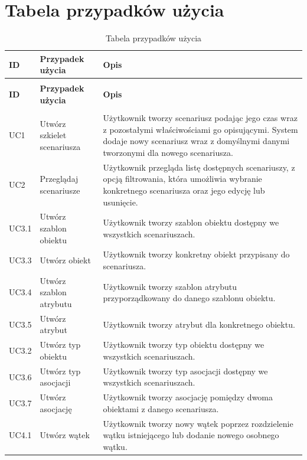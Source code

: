 \section{Tabela przypadków użycia}
\small{
\begin{longtable}{|p{1cm}|p{4.5cm}|p{8cm}|}
    \hline
    \textbf{ID} & \textbf{Przypadek użycia} & \textbf{Opis} \\
    \hline
    \endfirsthead
    \caption[]{Tabela przypadków użycia -- ciąg dalszy} \\
    \hline
    \textbf{ID} & \textbf{Przypadek użycia} & \textbf{Opis} \\
    \hline
    \endhead
    \hline
    \endfoot
    \hline
    \caption{Tabela przypadków użycia} \label{tab:use_case_table} \\
    \endlastfoot
    UC1 & Utwórz szkielet scenariusza & Użytkownik tworzy scenariusz podając jego czas wraz z pozostałymi właściwościami go opisującymi. System dodaje nowy scenariusz wraz z domyślnymi danymi tworzonymi dla nowego scenariusza. \\
    \hline
    UC2 & Przeglądaj scenariusze & Użytkownik przegląda listę dostępnych scenariuszy, z opcją filtrowania, która umożliwia wybranie konkretnego scenariusza oraz jego edycję lub usunięcie. \\
    \hline
    UC3.1 & Utwórz szablon obiektu & Użytkownik tworzy szablon obiektu dostępny we wszystkich scenariuszach. \\
    \hline
    UC3.3 & Utwórz obiekt & Użytkownik tworzy konkretny obiekt przypisany do scenariusza. \\
    \hline
    UC3.4 & Utwórz szablon atrybutu & Użytkownik tworzy szablon atrybutu przyporządkowany do danego szablonu obiektu. \\
    \hline
    UC3.5 & Utwórz atrybut & Użytkownik tworzy atrybut dla konkretnego obiektu. \\
    \hline
    UC3.2 & Utwórz typ obiektu & Użytkownik tworzy typ obiektu dostępny we wszystkich scenariuszach. \\
    \hline
    UC3.6 & Utwórz typ asocjacji & Użytkownik tworzy typ asocjacji dostępny we wszystkich scenariuszach. \\
    \hline
    UC3.7 & Utwórz asocjację & Użytkownik tworzy asocjację pomiędzy dwoma obiektami z danego scenariusza. \\
    \hline
    UC4.1 & Utwórz wątek & Użytkownik tworzy nowy wątek poprzez rozdzielenie wątku istniejącego lub dodanie nowego osobnego wątku. \\

\end{longtable}}

